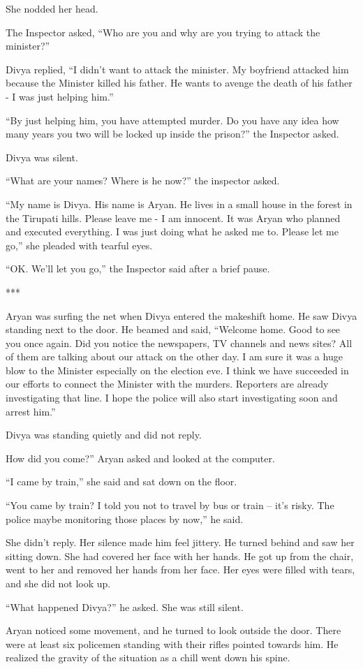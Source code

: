 She nodded her head.

The Inspector asked, “Who are you and why are you trying to attack the
minister?”

Divya replied, “I didn't want to attack the minister. My boyfriend attacked him
because the Minister killed his father. He wants to avenge the death of his
father - I was just helping him.”

“By just helping him, you have attempted murder. Do you have any idea how many
years you two will be locked up inside the prison?” the Inspector asked.

Divya was silent.

“What are your names? Where is he now?” the inspector asked.

“My name is Divya. His name is Aryan. He lives in a small house in the forest in
the Tirupati hills. Please leave me - I am innocent. It was Aryan who planned
and executed everything. I was just doing what he asked me to. Please let me
go,” she pleaded with tearful eyes.

“OK. We'll let you go,” the Inspector said after a brief pause.

***

Aryan was surfing the net when Divya entered the makeshift home. He saw Divya
standing next to the door. He beamed and said, “Welcome home. Good to see you
once again. Did you notice the newspapers, TV channels and news sites? All of
them are talking about our attack on the other day. I am sure it was a huge blow
to the Minister especially on the election eve. I think we have succeeded in our
efforts to connect the Minister with the murders. Reporters are already
investigating that line. I hope the police will also start investigating soon
and arrest him.”

Divya was standing quietly and did not reply.

How did you come?” Aryan asked and looked at the computer.

“I came by train,” she said and sat down on the floor.

“You came by train? I told you not to travel by bus or train – it's risky. The
police maybe monitoring those places by now,” he said.

She didn't reply. Her silence made him feel jittery. He turned behind and saw
her sitting down. She had covered her face with her hands. He got up from the
chair, went to her and removed her hands from her face. Her eyes were filled
with tears, and she did not look up.

“What happened Divya?” he asked. She was still silent.

Aryan noticed some movement, and he turned to look outside the door. There were
at least six policemen standing with their rifles pointed towards him. He
realized the gravity of the situation as a chill went down his spine.
